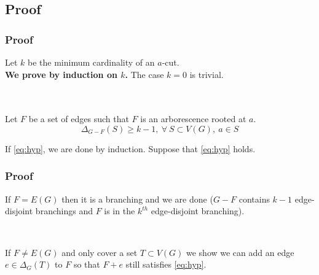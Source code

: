 \documentclass[8pt]{beamer}
\begin{document}
\subsection{Proof}
\begin{frame}
\frametitle{Proof}

Let $k$ be the minimum cardinality of an $a$-cut.\\
\textbf{We prove by induction on $k$.}
The case $k = 0$ is trivial.\\~\\



~

Let $F$ be a set of edges such that $F$ is an arborescence rooted at $a$.
\begin{equation}
    \Delta_{G-F}(S) \ge k-1,\ \forall\ S \subset V(G),\ a\in S  \label{eq:hyp}
\end{equation}

If \eqref{eq:hyp}, we are done by induction.
Suppose that \eqref{eq:hyp} holds.
\end{frame}
\begin{frame}
\frametitle{Proof}
    
If $F = E(G)$ then it is a branching and we are done ($G-F$ contains $k-1$ edge-disjoint branchings and $F$ is in the $k^{th}$ edge-disjoint branching).

~

If $F \neq E(G)$ and only cover a set $T \subset V(G)$ 
we show we can add an edge $e \in \Delta_G(T)$ to $F$ so that $F + e$ still satisfies \eqref{eq:hyp}.


\end{frame}
\end{document}
